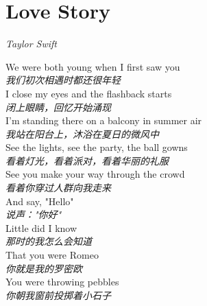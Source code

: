 \section{Love Story}

\thispagestyle{empty}


\begin{center}
\textit{Taylor Swift}
\end{center}

\vspace{1em}

\begin{spacing}{1.5}
\begin{flushleft}
We were both young when I first saw you\\
{\textit{我们初次相遇时都还很年轻}}\\[0.5em]

I close my eyes and the flashback starts\\
{\textit{闭上眼睛，回忆开始涌现}}\\[0.5em]

I'm standing there on a balcony in summer air\\
\textit{我站在阳台上，沐浴在夏日的微风中}\\[0.5em]

See the lights, see the party, the ball gowns\\
\textit{看着灯光，看着派对，看着华丽的礼服}\\[0.5em]

See you make your way through the crowd\\
\textit{看着你穿过人群向我走来}\\[0.5em]

And say, "Hello"\\
\textit{说声："你好"}\\[0.5em]

Little did I know\\
\textit{那时的我怎么会知道}\\[0.5em]

That you were Romeo\\
\textit{你就是我的罗密欧}\\[0.5em]

You were throwing pebbles\\
\textit{你朝我窗前投掷着小石子}\\[0.5em]


\end{flushleft}
\end{spacing}
